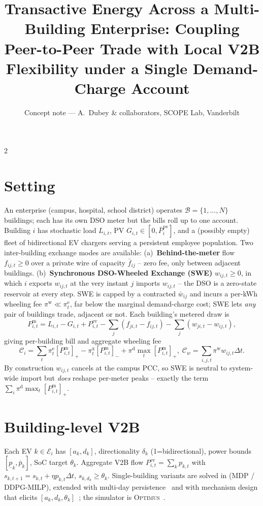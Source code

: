 \documentclass[10pt]{article}
\title{\vspace{-2.8em}\textbf{Transactive Energy Across a Multi-Building Enterprise:
Coupling Peer-to-Peer Trade with Local V2B Flexibility under a Single
Demand-Charge Account}\vspace{-0.6em}}
\author{\small Concept note --- A.\ Dubey \& collaborators, SCOPE Lab, Vanderbilt}
\date{\vspace{-1.4em}}
\begin{document}
\maketitle
\vspace{-1.6em}

\begin{multicols}{2}

\section*{Setting}
An enterprise (campus, hospital, school district) operates
$\mathcal{B}\!=\!\{1,\ldots,N\}$ buildings; each has its own DSO meter
but the bills roll up to one account. Building $i$ has stochastic load
$L_{i,t}$, PV $G_{i,t}\!\in\![0,\bar{P}_i^{\text{pv}}]$, and a (possibly
empty) fleet of bidirectional EV chargers serving a persistent employee
population. Two inter-building exchange modes are available:
(a)~\textbf{Behind-the-meter} flow $f_{ij,t}\!\ge\!0$ over a private
wire of capacity $\bar{f}_{ij}$ -- zero fee, only between adjacent
buildings.
(b)~\textbf{Synchronous DSO-Wheeled Exchange (SWE)} $w_{ij,t}\!\ge\!0$,
in which $i$ exports $w_{ij,t}$ at the very instant $j$ imports
$w_{ij,t}$ -- the DSO is a zero-state reservoir at every step. SWE is
capped by a contracted $\bar{w}_{ij}$ and incurs a per-kWh wheeling fee
$\pi^{\text{w}}\!\ll\!\pi^{\text{e}}_t$, far below the marginal
demand-charge cost; SWE lets \emph{any} pair of buildings trade,
adjacent or not. Each building's metered draw is
{\scriptsize\[
P^{\text{m}}_{i,t}=L_{i,t}-G_{i,t}+P^{\text{ev}}_{i,t}
-\textstyle\sum_j(f_{ji,t}\!-\!f_{ij,t})-\sum_j(w_{ji,t}\!-\!w_{ij,t}),
\]}%
giving per-building bill and aggregate wheeling fee
{\scriptsize\[
\mathcal{C}_i\!=\!\textstyle\sum_t\pi^{\text{e}}_t[P^{\text{m}}_{i,t}]_+
\!-\!\pi^{\text{x}}_t[P^{\text{m}}_{i,t}]_-
\!+\!\pi^{\text{d}}\max_t[P^{\text{m}}_{i,t}]_+,\;
\mathcal{C}_w\!=\!\textstyle\sum_{i,j,t}\pi^{\text{w}} w_{ij,t}\Delta t.
\]}%
By construction $w_{ij,t}$ cancels at the campus PCC, so SWE is neutral
to system-wide import but \emph{does} reshape per-meter peaks -- exactly
the term $\sum_i\pi^{\text{d}}\max_t[P^{\text{m}}_{i,t}]_+$.

\section*{Building-level V2B}
Each EV $k\!\in\!\mathcal{E}_i$ has $[a_k,d_k]$, directionality $\delta_k$
(1=bidirectional), power bounds $[\underline{p}_k,\bar{p}_k]$, SoC target
$\theta_k$. Aggregate V2B flow $P^{\text{ev}}_{i,t}\!=\!\sum_k p_{k,t}$
with $s_{k,t+1}\!=\!s_{k,t}\!+\!\eta p_{k,t}\Delta t$,
$s_{k,d_k}\!\ge\!\theta_k$. Single-building variants are solved in
\cite{sen2025iccps,liu2024reinforcement} (MDP / DDPG-MILP), extended with
multi-day persistence~\cite{iccps2026_pv2b} and with mechanism design
that elicits $[a_k,d_k,\theta_k]$~\cite{sen2026negotiations}; the
simulator is \textsc{Optimus}~\cite{talusan2024smartcomp}.


\end{multicols}
\end{document}
